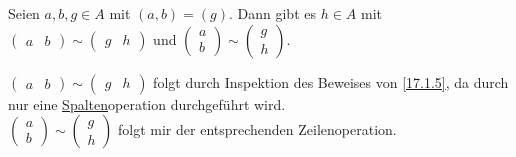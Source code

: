 \documentclass[../../main.tex]{subfiles}
\begin{document}
\begin{lem}\label{17.1.8}
    Seien $a,b,g\in A$ mit $(a,b)=(g)$. Dann gibt es $h\in A$ mit $\begin{pmatrix*}a&b\end{pmatrix*}\sim \begin{pmatrix*}g&h\end{pmatrix*}$ und $\begin{pmatrix*}a\\b\end{pmatrix*}\sim \begin{pmatrix*}g\\h\end{pmatrix*}$.
\end{lem}
\begin{cproof}
    $\begin{pmatrix*}a&b\end{pmatrix*}\sim \begin{pmatrix*}g&h\end{pmatrix*}$ folgt durch Inspektion des Beweises von \ref{17.1.5}, da durch nur eine \underline{Spalten}operation durchgeführt wird.\\
    $\begin{pmatrix*}a\\b\end{pmatrix*}\sim \begin{pmatrix*}g\\h\end{pmatrix*}$ folgt mir der entsprechenden Zeilenoperation.
\end{cproof}
\end{document}
